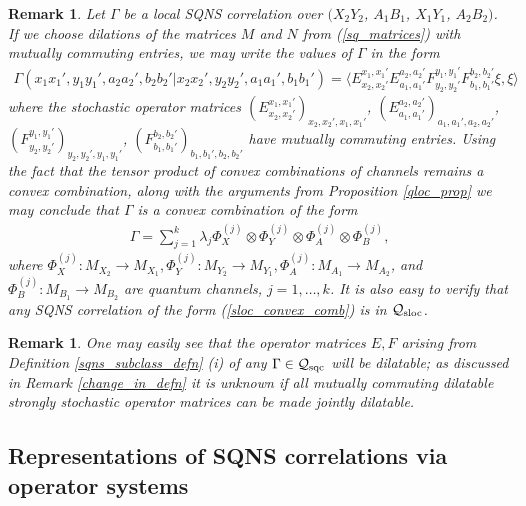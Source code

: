 \documentclass[11pt]{amsart}
\newtheorem{remark}[theorem]{Remark}
\newcommand{\cl}[1]{\mathcal{#1}}
\begin{document}
\begin{remark}\label{sloc_convex_remark}
\rm Let $\Gamma$ be a local SQNS correlation over $(X_{2}Y_{2}$, $A_{1}B_{1}$, $X_{1}Y_{1}$, $A_{2}B_{2})$. If we choose dilations of the matrices $M$ and $N$ from (\ref{sq_matrices}) with mutually commuting entries, we may write the values of $\Gamma$ in the form
\begin{gather*}
	\Gamma(x_{1}x_{1}', y_{1}y_{1}', a_{2}a_{2}', b_{2}b_{2}'|x_{2}x_{2}', y_{2}y_{2}', a_{1}a_{1}', b_{1}b_{1}') = \langle E_{x_{2}, x_{2}'}^{x_{1}, x_{1}'}E_{a_{1}, a_{1}'}^{a_{2}, a_{2}'}F_{y_{2}, y_{2}'}^{y_{1}, y_{1}'}F_{b_{1}, b_{1}'}^{b_{2}, b_{2}'}\xi, \xi\rangle
\end{gather*}
\noindent where the stochastic operator matrices $(E_{x_{2}, x_{2}'}^{x_{1}, x_{1}'})_{x_{2}, x_{2}', x_{1}, x_{1}'}$, $(E_{a_{1}, a_{1}'}^{a_{2}, a_{2}'})_{a_{1}, a_{1}', a_{2}, a_{2}'}$, $(F_{y_{2}, y_{2}'}^{y_{1}, y_{1}'})_{y_{2}, y_{2}', y_{1}, y_{1}'}$, $(F_{b_{1}, b_{1}'}^{b_{2}, b_{2}'})_{b_{1}, b_{1}', b_{2}, b_{2}'}$ have mutually commuting entries. Using the fact that the tensor product of convex combinations of channels remains a convex combination, along with the arguments from Proposition \ref{qloc_prop} we may conclude that $\Gamma$ is a convex combination of the form
\begin{gather}\label{sloc_convex_comb}
	\Gamma = \sum\limits_{j=1}^{k}\lambda_{j}\Phi_{X}^{(j)}\otimes \Phi_{Y}^{(j)}\otimes \Phi_{A}^{(j)}\otimes \Phi_{B}^{(j)}, 
\end{gather}
\noindent where $\Phi_{X}^{(j)}: M_{X_{2}}\rightarrow M_{X_{1}}, \Phi_{Y}^{(j)}: M_{Y_{2}}\rightarrow M_{Y_{1}}, \Phi_{A}^{(j)}: M_{A_{1}}\rightarrow M_{A_{2}}$, and $\Phi_{B}^{(j)}: M_{B_{1}}\rightarrow M_{B_{2}}$ are quantum channels, $j = 1, \hdots, k$. It is also easy to verify that any SQNS correlation of the form (\ref{sloc_convex_comb}) is in $\cl{Q}_{\rm sloc}$. 
\end{remark}

\begin{remark}
\rm One may easily see that the operator matrices $E, F$ arising from Definition \ref{sqns_subclass_defn} (i) of any $\Gamma \in \cl{Q}_{\rm sqc}$ will be dilatable; as discussed in Remark \ref{change_in_defn} it is unknown if all mutually commuting dilatable strongly stochastic operator matrices can be made jointly dilatable. 
\end{remark}

\subsection{Representations of SQNS correlations via operator systems}
\end{document}
